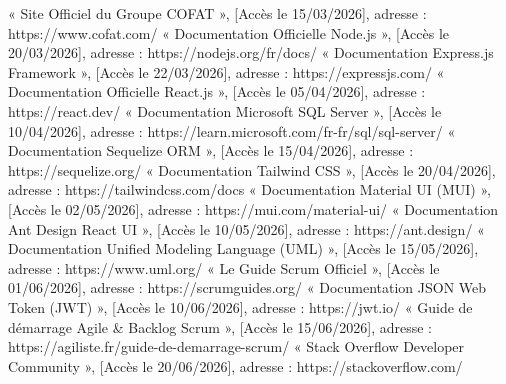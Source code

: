 \noindent [1] « Site Officiel du Groupe COFAT », [Accès le 15/03/2026], adresse : https://www.cofat.com/ \newline
\noindent [2] « Documentation Officielle Node.js », [Accès le 20/03/2026], adresse : https://nodejs.org/fr/docs/ \newline
\noindent [3] « Documentation Express.js Framework », [Accès le 22/03/2026], adresse : https://expressjs.com/ \newline
\noindent [4] « Documentation Officielle React.js », [Accès le 05/04/2026], adresse : https://react.dev/ \newline
\noindent [5] « Documentation Microsoft SQL Server », [Accès le 10/04/2026], adresse : https://learn.microsoft.com/fr-fr/sql/sql-server/ \newline
\noindent [6] « Documentation Sequelize ORM », [Accès le 15/04/2026], adresse : https://sequelize.org/ \newline
\noindent [7] « Documentation Tailwind CSS », [Accès le 20/04/2026], adresse : https://tailwindcss.com/docs \newline
\noindent [8] « Documentation Material UI (MUI) », [Accès le 02/05/2026], adresse : https://mui.com/material-ui/ \newline
\noindent [9] « Documentation Ant Design React UI », [Accès le 10/05/2026], adresse : https://ant.design/ \newline
\noindent [10] « Documentation Unified Modeling Language (UML) », [Accès le 15/05/2026], adresse : https://www.uml.org/ \newline
\noindent [11] « Le Guide Scrum Officiel », [Accès le 01/06/2026], adresse : https://scrumguides.org/ \newline
\noindent [12] « Documentation JSON Web Token (JWT) », [Accès le 10/06/2026], adresse : https://jwt.io/ \newline
\noindent [13] « Guide de démarrage Agile & Backlog Scrum », [Accès le 15/06/2026], adresse : https://agiliste.fr/guide-de-demarrage-scrum/ \newline
\noindent [14] « Stack Overflow Developer Community », [Accès le 20/06/2026], adresse : https://stackoverflow.com/ \newline
